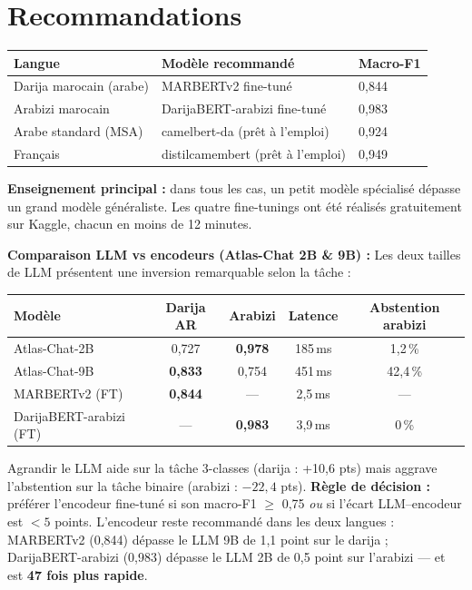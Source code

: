 \documentclass[11pt, a4paper]{article}
\begin{document}
\section{Recommandations}

\begin{center}
\begin{tabular}{lll}
\toprule
\textbf{Langue} & \textbf{Modèle recommandé} & \textbf{Macro-F1} \\
\midrule
Darija marocain (arabe)  & MARBERTv2 fine-tuné        & 0{,}844 \\
Arabizi marocain         & DarijaBERT-arabizi fine-tuné & 0{,}983 \\
Arabe standard (MSA)     & camelbert-da (prêt à l'emploi) & 0{,}924 \\
Français                 & distilcamembert (prêt à l'emploi) & 0{,}949 \\
\bottomrule
\end{tabular}
\end{center}

\textbf{Enseignement principal :} dans tous les cas, un petit modèle
spécialisé dépasse un grand modèle généraliste. Les quatre fine-tunings
ont été réalisés gratuitement sur Kaggle, chacun en moins de 12 minutes.

\medskip
\textbf{Comparaison LLM vs encodeurs (Atlas-Chat 2B \& 9B) :}
Les deux tailles de LLM présentent une inversion remarquable selon la tâche :

\vspace{4pt}
\begin{center}
\small
\begin{tabular}{lcccc}
\toprule
\textbf{Modèle} & \textbf{Darija AR} & \textbf{Arabizi} & \textbf{Latence} & \textbf{Abstention arabizi} \\
\midrule
Atlas-Chat-2B & 0{,}727 & \textbf{0{,}978} & 185\,ms & 1{,}2\,\% \\
Atlas-Chat-9B & \textbf{0{,}833} & 0{,}754 & 451\,ms & 42{,}4\,\% \\
MARBERTv2 (FT) & \textbf{0{,}844} & — & 2{,}5\,ms & — \\
DarijaBERT-arabizi (FT) & — & \textbf{0{,}983} & 3{,}9\,ms & 0\,\% \\
\bottomrule
\end{tabular}
\end{center}

\vspace{2pt}
Agrandir le LLM aide sur la tâche 3-classes (darija : +10{,}6 pts) mais aggrave l'abstention
sur la tâche binaire (arabizi : $-22{,}4$ pts). \textbf{Règle de décision :} préférer
l'encodeur fine-tuné si son macro-F1 $\geq$ 0{,}75 \emph{ou} si l'écart LLM--encodeur
est $< 5$ points. L'encodeur reste recommandé dans les deux langues : MARBERTv2 (0{,}844)
dépasse le LLM 9B de 1{,}1 point sur le darija ; DarijaBERT-arabizi (0{,}983) dépasse
le LLM 2B de 0{,}5 point sur l'arabizi — et est \textbf{47 fois plus rapide}.
\end{document}
